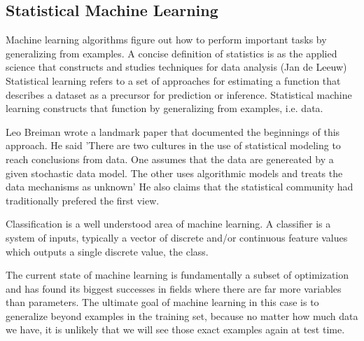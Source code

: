 


\subsection{Statistical Machine Learning}

Machine learning algorithms figure out how to perform important tasks by generalizing from examples. A concise definition of statistics is as the applied science that constructs and studies techniques for data analysis (Jan de Leeuw) Statistical learning refers to a set of approaches for estimating a function that describes a dataset as a precursor for prediction or inference.\cite{James2013} Statistical machine learning constructs that function by generalizing from examples, i.e. data.

Leo Breiman wrote a landmark paper that documented the beginnings of this approach. He said 'There are two cultures in the use of statistical modeling to reach conclusions from data. One assumes that the data are genereated by a given stochastic data model. The other uses algorithmic models and treats the data mechanisms as unknown' \cite{Breiman2001} He also claims that the statistical community had traditionally prefered the first view.

Classification is a well understood area of machine learning. A classifier is a system of inputs, typically a vector of discrete and/or continuous feature values which outputs a single discrete value, the class.\cite{Domingos2012}

The current state of machine learning is fundamentally a subset of optimization and has found its biggest successes in fields where there are far more variables than parameters. The ultimate goal of machine learning in this case is to generalize beyond examples in the training set, because no matter how much data we have, it is unlikely that we will see those exact examples again at test time.\cite{Domingos2012} 


